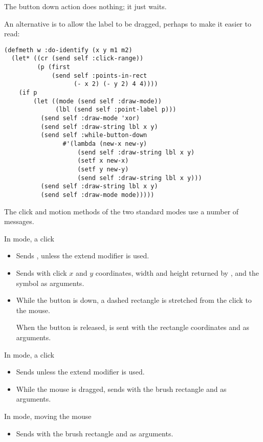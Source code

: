 \begin{slide}{}
The button down action does nothing; it just waits.

An alternative is to allow the label to be dragged, perhaps to make
it easier to read:
{\large
\begin{verbatim}
(defmeth w :do-identify (x y m1 m2)
  (let* ((cr (send self :click-range))
         (p (first
             (send self :points-in-rect 
                   (- x 2) (- y 2) 4 4))))
    (if p
        (let ((mode (send self :draw-mode))
              (lbl (send self :point-label p)))
          (send self :draw-mode 'xor)
          (send self :draw-string lbl x y)
          (send self :while-button-down
                #'(lambda (new-x new-y)
                    (send self :draw-string lbl x y)
                    (setf x new-x)
                    (setf y new-y)
                    (send self :draw-string lbl x y)))
          (send self :draw-string lbl x y)
          (send self :draw-mode mode)))))
\end{verbatim}}
\end{slide}

\begin{slide}{}
The click and motion methods of the two standard modes
use a number of messages.

In  mode, a click
\begin{itemize}
\item
Sends , unless the extend modifier is used.
\item
Sends  with click $x$ and $y$
coordinates, width and height returned by ,
and the symbol  as arguments.
\item
While the button is down, a dashed rectangle is stretched from the
click to the mouse.

When the button is released,  is sent
with the rectangle coordinates and  as arguments.
\end{itemize}
\end{slide}

\begin{slide}{}
In  mode, a click
\begin{itemize}
\item
Sends  unless the extend modifier is used.
\item
While the mouse is dragged, sends  with
the brush rectangle and  as arguments.
\end{itemize}
In  mode, moving the mouse
\begin{itemize}
\item
Sends  with the brush rectangle and
 as arguments.
\end{itemize}
\end{slide}

